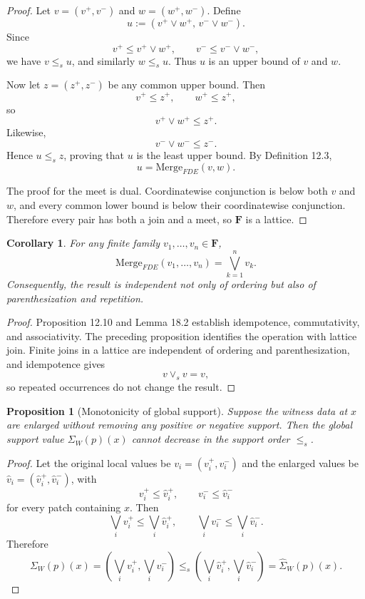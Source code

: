 \documentclass[11pt]{book}
\newtheorem*{appendixproposition}{Proposition}
\newtheorem*{appendixcorollary}{Corollary}
\begin{document}
\begin{proof}
Let $v=(v^+,v^-)$ and $w=(w^+,w^-)$. Define
\[
u:=(v^+\vee w^+,\,v^-\vee w^-).
\]
Since
\[
v^+\leq v^+\vee w^+,
\qquad
v^-\leq v^-\vee w^-,
\]
we have $v\leq_s u$, and similarly $w\leq_s u$. Thus $u$ is an upper
bound of $v$ and $w$.

Now let $z=(z^+,z^-)$ be any common upper bound. Then
\[
v^+\leq z^+,\qquad w^+\leq z^+,
\]
so
\[
v^+\vee w^+\leq z^+.
\]
Likewise,
\[
v^-\vee w^-\leq z^-.
\]
Hence $u\leq_s z$, proving that $u$ is the least upper bound. By
Definition 12.3,
\[
u=\mathrm{Merge}_{FDE}(v,w).
\]

The proof for the meet is dual. Coordinatewise conjunction is below both
$v$ and $w$, and every common lower bound is below their coordinatewise
conjunction. Therefore every pair has both a join and a meet, so
$\mathbf F$ is a lattice.
\end{proof}

\begin{appendixcorollary}
For any finite family $v_1,\dots,v_n\in\mathbf F$,
\[
\mathrm{Merge}_{FDE}(v_1,\dots,v_n)
=
\bigvee_{k=1}^n v_k.
\]
Consequently, the result is independent not only of ordering but also of
parenthesization and repetition.
\end{appendixcorollary}

\begin{proof}
Proposition 12.10 and Lemma 18.2 establish idempotence, commutativity, and
associativity. The preceding proposition identifies the operation with
lattice join. Finite joins in a lattice are independent of ordering and
parenthesization, and idempotence gives
\[
v\vee_s v=v,
\]
so repeated occurrences do not change the result.
\end{proof}

\begin{appendixproposition}[Monotonicity of global support]
Suppose the witness data at $x$ are enlarged without removing any
positive or negative support. Then the global support value
$\Sigma_W(p)(x)$ cannot decrease in the support order $\leq_s$.
\end{appendixproposition}

\begin{proof}
Let the original local values be $v_i=(v_i^+,v_i^-)$ and the enlarged
values be $\hat v_i=(\hat v_i^+,\hat v_i^-)$, with
\[
v_i^+\leq\hat v_i^+,
\qquad
v_i^-\leq\hat v_i^-
\]
for every patch containing $x$. Then
\[
\bigvee_i v_i^+
\leq
\bigvee_i \hat v_i^+,
\qquad
\bigvee_i v_i^-
\leq
\bigvee_i \hat v_i^-.
\]
Therefore
\[
\Sigma_W(p)(x)
=
\left(\bigvee_i v_i^+,\bigvee_i v_i^-\right)
\leq_s
\left(\bigvee_i\hat v_i^+,\bigvee_i\hat v_i^-\right)
=
\hat\Sigma_W(p)(x).
\]
\end{proof}
\end{document}
